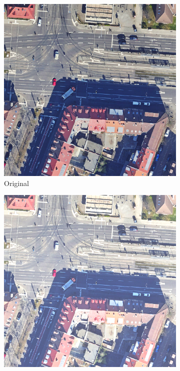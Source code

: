 \begin{figure}[h]
	\centering
	\begin{subfigure}{.32\textwidth}
		\centering
		\includegraphics[width=1.\linewidth]{Bilder/color_aug/149_karlsruhe.png}
		Original
	\end{subfigure}
	\begin{subfigure}{.32\textwidth}
		\centering
		\includegraphics[width=1.\linewidth]{Bilder/color_aug/RandomBrightness.png}

\end{subfigure}
\end{figure}
